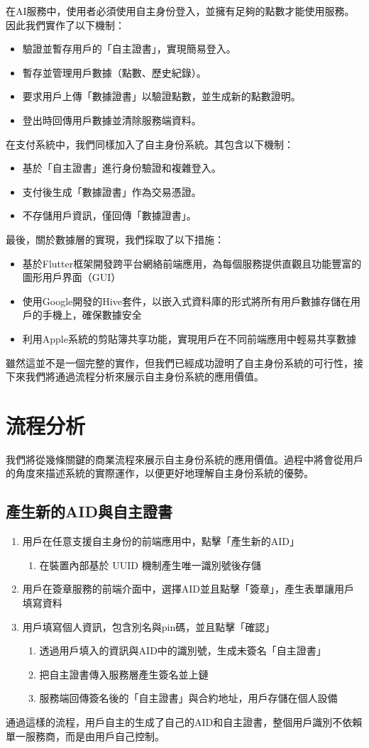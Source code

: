 在AI服務中，使用者必須使用自主身份登入，並擁有足夠的點數才能使用服務。因此我們實作了以下機制：
\begin{itemize}
  \item 驗證並暫存用戶的「自主證書」，實現簡易登入。
  \item 暫存並管理用戶數據（點數、歷史紀錄）。
  \item 要求用戶上傳「數據證書」以驗證點數，並生成新的點數證明。
  \item 登出時回傳用戶數據並清除服務端資料。
  \end{itemize}
在支付系統中，我們同樣加入了自主身份系統。其包含以下機制：
\begin{itemize}
  \item 基於「自主證書」進行身份驗證和複雜登入。
  \item 支付後生成「數據證書」作為交易憑證。
  \item 不存儲用戶資訊，僅回傳「數據證書」。
  \end{itemize}
最後，關於數據層的實現，我們採取了以下措施：
\begin{itemize}
  \item 基於Flutter框架開發跨平台網絡前端應用，為每個服務提供直觀且功能豐富的圖形用戶界面（GUI）
  \item 使用Google開發的Hive套件，以嵌入式資料庫的形式將所有用戶數據存儲在用戶的手機上，確保數據安全
  \item 利用Apple系統的剪貼簿共享功能，實現用戶在不同前端應用中輕易共享數據
\end{itemize}
雖然這並不是一個完整的實作，但我們已經成功證明了自主身份系統的可行性，接下來我們將通過流程分析來展示自主身份系統的應用價值。
\section{流程分析}
我們將從幾條關鍵的商業流程來展示自主身份系統的應用價值。過程中將會從用戶的角度來描述系統的實際運作，以便更好地理解自主身份系統的優勢。
\subsection{產生新的AID與自主證書}
\begin{enumerate}
  \item 用戶在任意支援自主身份的前端應用中，點擊「產生新的AID」
  \begin{enumerate}
    \item 在裝置內部基於 UUID 機制產生唯一識別號後存儲
  \end{enumerate}
  \item 用戶在簽章服務的前端介面中，選擇AID並且點擊「簽章」，產生表單讓用戶填寫資料
  \item 用戶填寫個人資訊，包含別名與pin碼，並且點擊「確認」
  \begin{enumerate}
    \item 透過用戶填入的資訊與AID中的識別號，生成未簽名「自主證書」
    \item 把自主證書傳入服務層產生簽名並上鏈
    \item 服務端回傳簽名後的「自主證書」與合約地址，用戶存儲在個人設備
  \end{enumerate}
\end{enumerate}
通過這樣的流程，用戶自主的生成了自己的AID和自主證書，整個用戶識別不依賴單一服務商，而是由用戶自己控制。

